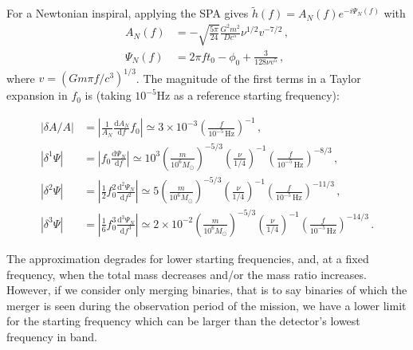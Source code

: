 \documentclass[aps,showpacs,%
prd,superscriptaddress,nofootinbib]{revtex4}
\newcommand\ud{{\mathrm{d}}}
\newcommand{\Hz}{\,\mathrm{Hz}}
\newcommand{\Msol}{M_{\odot}}
\begin{document}
For a Newtonian inspiral, applying the SPA gives $\tilde{h}(f) = A_{N}(f)e^{-i\Psi_{N}(f)}$ with
%
\begin{subequations}
\begin{align}
	A_{N}(f) &= -\sqrt{\frac{5\pi}{24}} \frac{G^{2}m^{2}}{Dc^{5}} \nu^{1/2}v^{-7/2}\,,\\
	\Psi_{N}(f) &= 2\pi f t_{0} - \phi_{0} + \frac{3}{128\nu v^{5}} \,, 
\end{align}
\end{subequations}
%
where $v=(G m \pi f/c^{3})^{1/3}$. The magnitude of the first terms in a Taylor expansion in $f_{0}$ is (taking $10^{-5}\mathrm{Hz}$ as a reference starting frequency):
%
\begin{widetext}
\begin{subequations}
\begin{align}
	|\delta A/A| &= \left| \frac{1}{A_{N}}\frac{\ud A_{N}}{\ud f} f_0 \right| \simeq 3\times10^{-3} \left(\frac{f}{10^{-5}\Hz}\right)^{-1} \,,\\
	|\delta^{1}\Psi | &= \left| f_0\frac{\ud \Psi_{N}}{\ud f} \right| \simeq 10^{3}\left( \frac{m}{10^{6}\Msol} \right)^{-5/3} \left( \frac{\nu}{1/4} \right)^{-1} \left( \frac{f}{10^{-5}\Hz} \right)^{-8/3} \,, \\
	|\delta^{2}\Psi | &= \left| \frac{1}{2} f_0^{2}\frac{\ud^{2} \Psi_{N}}{\ud f^{2}} \right| \simeq 5 \left( \frac{m}{10^{6}\Msol} \right)^{-5/3} \left( \frac{\nu}{1/4} \right)^{-1} \left( \frac{f}{10^{-5}\Hz} \right)^{-11/3} \,, \\
	|\delta^{3}\Psi | &= \left| \frac{1}{6} f_0^{3}\frac{\ud^{3} \Psi_{N}}{\ud f^{3}} \right| \simeq 2\times 10^{-2} \left( \frac{m}{10^{6}\Msol} \right)^{-5/3} \left( \frac{\nu}{1/4} \right)^{-1} \left( \frac{f}{10^{-5}\Hz} \right)^{-14/3} \,.
\end{align}
\end{subequations}
\end{widetext}
%
The approximation degrades for lower starting frequencies, and, at a fixed frequency, when the total mass decreases and/or the mass ratio increases. However, if we consider only merging binaries, that is to say binaries of which the merger is seen during the observation period of the mission, we have a lower limit for the starting frequency which can be larger than the detector's lowest frequency in band.
\end{document}
